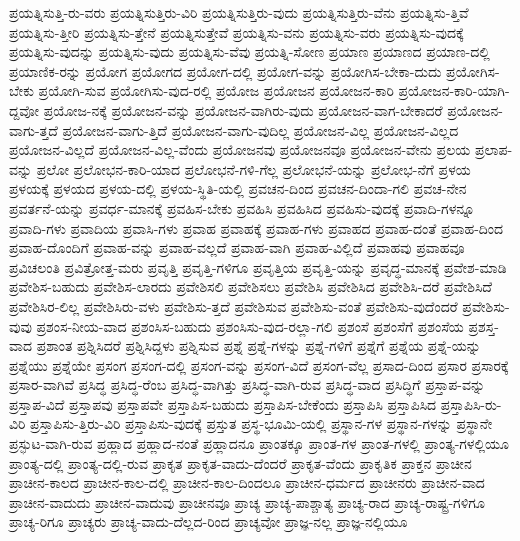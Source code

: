 {ಪ್ರಯತ್ನಿಸುತ್ತಿ-ರು-ವರು
ಪ್ರಯತ್ನಿಸುತ್ತಿರು-ವಿರಿ
ಪ್ರಯತ್ನಿಸುತ್ತಿರು-ವುದು
ಪ್ರಯತ್ನಿಸುತ್ತಿರು-ವೆನು
ಪ್ರಯತ್ನಿಸು-ತ್ತಿವೆ
ಪ್ರಯತ್ನಿಸು-ತ್ತೀರಿ
ಪ್ರಯತ್ನಿಸು-ತ್ತೇನೆ
ಪ್ರಯತ್ನಿಸುತ್ತೇವೆ
ಪ್ರಯತ್ನಿಸು-ವನು
ಪ್ರಯತ್ನಿಸು-ವರು
ಪ್ರಯತ್ನಿಸು-ವುದಕ್ಕೆ
ಪ್ರಯತ್ನಿಸು-ವುದನ್ನು
ಪ್ರಯತ್ನಿಸು-ವುದು
ಪ್ರಯತ್ನಿಸು-ವೆವು
ಪ್ರಯತ್ನಿ-ಸೋಣ
ಪ್ರಯಾಣ
ಪ್ರಯಾಣದ
ಪ್ರಯಾಣ-ದಲ್ಲಿ
ಪ್ರಯಾಣಿಕ-ರನ್ನು
ಪ್ರಯೋಗ
ಪ್ರಯೋಗದ
ಪ್ರಯೋಗ-ದಲ್ಲಿ
ಪ್ರಯೋಗ-ವನ್ನು
ಪ್ರಯೋಗಿಸ-ಬೇಕಾ-ದುದು
ಪ್ರಯೋಗಿಸ-ಬೇಕು
ಪ್ರಯೋಗಿ-ಸುವ
ಪ್ರಯೋಗಿಸು-ವುದ-ರಲ್ಲಿ
ಪ್ರಯೋಜ
ಪ್ರಯೋಜನ
ಪ್ರಯೋಜನ-ಕಾರಿ
ಪ್ರಯೋಜನ-ಕಾರಿ-ಯಾಗಿ-ದ್ದವೋ
ಪ್ರಯೋಜ-ನಕ್ಕೆ
ಪ್ರಯೋಜನ-ವನ್ನು
ಪ್ರಯೋಜನ-ವಾಗಿರು-ವುದು
ಪ್ರಯೋಜನ-ವಾಗ-ಬೇಕಾದರೆ
ಪ್ರಯೋಜನ-ವಾಗು-ತ್ತದೆ
ಪ್ರಯೋಜನ-ವಾಗು-ತ್ತಿದೆ
ಪ್ರಯೋಜನ-ವಾಗು-ವುದಿಲ್ಲ
ಪ್ರಯೋಜನ-ವಿಲ್ಲ
ಪ್ರಯೋಜನ-ವಿಲ್ಲದ
ಪ್ರಯೋಜನ-ವಿಲ್ಲದೆ
ಪ್ರಯೋಜನ-ವಿಲ್ಲ-ವೆಂದು
ಪ್ರಯೋಜನವು
ಪ್ರಯೋಜನವೂ
ಪ್ರಯೋಜನ-ವೇನು
ಪ್ರಲಯ
ಪ್ರಲಾಪ-ವನ್ನು
ಪ್ರಲೋ
ಪ್ರಲೋಭನ-ಕಾರಿ-ಯಾದ
ಪ್ರಲೋಭನೆ-ಗಳಿ-ಗೆಲ್ಲ
ಪ್ರಲೋಭನೆ-ಯನ್ನು
ಪ್ರಲೋಭ-ನೆಗೆ
ಪ್ರಳಯ
ಪ್ರಳಯಕ್ಕೆ
ಪ್ರಳಯದ
ಪ್ರಳಯ-ದಲ್ಲಿ
ಪ್ರಳಯ-ಸ್ಥಿತಿ-ಯಲ್ಲಿ
ಪ್ರವಚನ-ದಿಂದ
ಪ್ರವಚನ-ದಿಂದಾ-ಗಲಿ
ಪ್ರವಚ-ನೇನ
ಪ್ರವರ್ತನೆ-ಯನ್ನು
ಪ್ರವರ್ಧ-ಮಾನಕ್ಕೆ
ಪ್ರವಹಿಸ-ಬೇಕು
ಪ್ರವಹಿಸಿ
ಪ್ರವಹಿಸಿದ
ಪ್ರವಹಿಸು-ವುದಕ್ಕೆ
ಪ್ರವಾದಿ-ಗಳನ್ನೂ
ಪ್ರವಾದಿ-ಗಳು
ಪ್ರವಾದಿಯ
ಪ್ರವಾಸಿ-ಗಳು
ಪ್ರವಾಹ
ಪ್ರವಾಹಕ್ಕೆ
ಪ್ರವಾಹ-ಗಳು
ಪ್ರವಾಹದ
ಪ್ರವಾಹ-ದಂತೆ
ಪ್ರವಾಹ-ದಿಂದ
ಪ್ರವಾಹ-ದೊಂದಿಗೆ
ಪ್ರವಾಹ-ವನ್ನು
ಪ್ರವಾಹ-ವಲ್ಲದೆ
ಪ್ರವಾಹ-ವಾಗಿ
ಪ್ರವಾಹ-ವಿಲ್ಲಿದೆ
ಪ್ರವಾಹವು
ಪ್ರವಾಹವೂ
ಪ್ರವಿಚಲಂತಿ
ಪ್ರವಿತ್ರೋತ್ತ-ಮರು
ಪ್ರವೃತ್ತಿ
ಪ್ರವೃತ್ತಿ-ಗಳಿಗೂ
ಪ್ರವೃತ್ತಿಯ
ಪ್ರವೃತ್ತಿ-ಯನ್ನು
ಪ್ರವೃದ್ಧ-ಮಾನಕ್ಕೆ
ಪ್ರವೇಶ-ಮಾಡಿ
ಪ್ರವೇಶಿಸ-ಬಹುದು
ಪ್ರವೇಶಿಸ-ಲಾರದು
ಪ್ರವೇಶಿಸಲಿ
ಪ್ರವೇಶಿಸಲು
ಪ್ರವೇಶಿಸಿ
ಪ್ರವೇಶಿಸಿದ
ಪ್ರವೇಶಿಸಿ-ದರೆ
ಪ್ರವೇಶಿಸಿದೆ
ಪ್ರವೇಶಿಸಿರ-ಲಿಲ್ಲ
ಪ್ರವೇಶಿಸಿರು-ವಳು
ಪ್ರವೇಶಿಸು-ತ್ತದೆ
ಪ್ರವೇಶಿಸುವ
ಪ್ರವೇಶಿಸು-ವಂತೆ
ಪ್ರವೇಶಿಸು-ವುದೆಂದರೆ
ಪ್ರವೇಶಿಸು-ವುವು
ಪ್ರಶಂಸ-ನೀಯ-ವಾದ
ಪ್ರಶಂಸಿಸ-ಬಹುದು
ಪ್ರಶಂಸಿಸು-ವುದ-ರಲ್ಲಾ-ಗಲಿ
ಪ್ರಶಂಸೆ
ಪ್ರಶಂಸೆಗೆ
ಪ್ರಶಂಸೆಯ
ಪ್ರಶಸ್ತ-ವಾದ
ಪ್ರಶಾಂತ
ಪ್ರಶ್ನಿಸಿದರೆ
ಪ್ರಶ್ನಿಸಿದ್ದಳು
ಪ್ರಶ್ನಿಸುವ
ಪ್ರಶ್ನೆ
ಪ್ರಶ್ನೆ-ಗಳನ್ನು
ಪ್ರಶ್ನೆ-ಗಳಿಗೆ
ಪ್ರಶ್ನೆಗೆ
ಪ್ರಶ್ನೆಯ
ಪ್ರಶ್ನೆ-ಯನ್ನು
ಪ್ರಶ್ನೆಯು
ಪ್ರಶ್ನೆಯೇ
ಪ್ರಸಂಗ
ಪ್ರಸಂಗ-ದಲ್ಲಿ
ಪ್ರಸಂಗ-ವನ್ನು
ಪ್ರಸಂಗ-ವಿದೆ
ಪ್ರಸಂಗ-ವೆಲ್ಲ
ಪ್ರಸಾದ-ದಿಂದ
ಪ್ರಸಾರ
ಪ್ರಸಾರಕ್ಕೆ
ಪ್ರಸಾರ-ವಾಗಿವೆ
ಪ್ರಸಿದ್ಧ
ಪ್ರಸಿದ್ಧ-ರೆಂಬ
ಪ್ರಸಿದ್ಧ-ವಾಗಿತ್ತು
ಪ್ರಸಿದ್ಧ-ವಾಗಿ-ರುವ
ಪ್ರಸಿದ್ಧ-ವಾದ
ಪ್ರಸಿದ್ಧಿಗೆ
ಪ್ರಸ್ತಾಪ-ವನ್ನು
ಪ್ರಸ್ತಾಪ-ವಿದೆ
ಪ್ರಸ್ತಾಪವು
ಪ್ರಸ್ತಾಪವೇ
ಪ್ರಸ್ತಾಪಿಸ-ಬಹುದು
ಪ್ರಸ್ತಾಪಿಸ-ಬೇಕೆಂದು
ಪ್ರಸ್ತಾಪಿಸಿ
ಪ್ರಸ್ತಾಪಿಸಿದ
ಪ್ರಸ್ತಾಪಿಸಿ-ರು-ವಿರಿ
ಪ್ರಸ್ತಾಪಿಸು-ತ್ತಿರು-ವಿರಿ
ಪ್ರಸ್ತಾಪಿಸು-ವುದಕ್ಕೆ
ಪ್ರಸ್ತುತ
ಪ್ರಸ್ಥ-ಭೂಮಿ-ಯಲ್ಲಿ
ಪ್ರಸ್ಥಾನ-ಗಳ
ಪ್ರಸ್ಥಾನ-ಗಳನ್ನು
ಪ್ರಸ್ಥಾನೇ
ಪ್ರಸ್ಫುಟ-ವಾಗಿ-ರುವ
ಪ್ರಹ್ಲಾದ
ಪ್ರಹ್ಲಾದ-ನಂತೆ
ಪ್ರಹ್ಲಾದನೂ
ಪ್ರಾಂತಕ್ಕೂ
ಪ್ರಾಂತ-ಗಳ
ಪ್ರಾಂತ-ಗಳಲ್ಲಿ
ಪ್ರಾಂತ್ಯ-ಗಳಲ್ಲಿಯೂ
ಪ್ರಾಂತ್ಯ-ದಲ್ಲಿ
ಪ್ರಾಂತ್ಯ-ದಲ್ಲಿ-ರುವ
ಪ್ರಾಕೃತ
ಪ್ರಾಕೃತ-ವಾದು-ದೆಂದರೆ
ಪ್ರಾಕೃತ-ವೆಂದು
ಪ್ರಾಕೃತಿಕ
ಪ್ರಾಕ್ತನ
ಪ್ರಾಚೀನ
ಪ್ರಾಚೀನ-ಕಾಲದ
ಪ್ರಾಚೀನ-ಕಾಲ-ದಲ್ಲಿ
ಪ್ರಾಚೀನ-ಕಾಲ-ದಿಂದಲೂ
ಪ್ರಾಚೀನ-ಧರ್ಮದ
ಪ್ರಾಚೀನರು
ಪ್ರಾಚೀನ-ವಾದ
ಪ್ರಾಚೀನ-ವಾದುದು
ಪ್ರಾಚೀನ-ವಾದುವು
ಪ್ರಾಚೀನವೂ
ಪ್ರಾಚ್ಯ
ಪ್ರಾಚ್ಯ-ಪಾಶ್ಚಾತ್ಯ
ಪ್ರಾಚ್ಯ-ರಾದ
ಪ್ರಾಚ್ಯ-ರಾಷ್ಟ್ರ-ಗಳಿಗೂ
ಪ್ರಾಚ್ಯ-ರಿಗೂ
ಪ್ರಾಚ್ಯರು
ಪ್ರಾಚ್ಯ-ವಾದು-ದೆಲ್ಲದ-ರಿಂದ
ಪ್ರಾಚ್ಯವೋ
ಪ್ರಾಜ್ಞ-ನಲ್ಲ
ಪ್ರಾಜ್ಞ-ನಲ್ಲಿಯೂ
}
